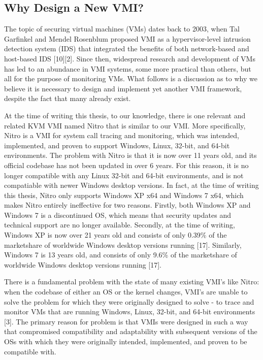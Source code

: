 \documentclass{report}
\begin{document}
\begin{spacing}{1.5}
\subsection{Why Design a New VMI?}

{\large
The topic of securing virtual machines (VMs) dates back to 2003, when Tal Garfinkel and Mendel Rosenblum proposed VMI as a hypervisor-level intrusion detection system (IDS) that integrated the benefits of both network-based and host-based IDS [10][2]. Since then, widespread research and development of VMs has led to an abundance in VMI systems, some more practical than others, but all for the purpose of monitoring VMs. What follows is a discussion as to why we believe it is necessary to design and implement yet another VMI framework, despite the fact that many already exist.
\newline
}


{\large
At the time of writing this thesis, to our knowledge, there is one relevant and related KVM VMI named Nitro that is similar to our VMI. More specifically, Nitro is a VMI for system call tracing and monitoring, which was intended, implemented, and proven to support Windows, Linux, 32-bit, and 64-bit environments. The problem with Nitro is that it is now over 11 years old, and its official codebase has not been updated in over 6 years. For this reason, it is no longer compatible with any Linux 32-bit and 64-bit environments, and is not compatiable with newer Windows desktop versions. In fact, at the time of writing this thesis, Nitro only supports Windows XP x64 and Windows 7 x64, which makes Nitro entirely ineffective for two reasons. Firstly, both Windows XP and Windows 7 is a discontinued OS, which means that security updates and technical support are no longer available. Secondly, at the time of writing, Windows XP is now over 21 years old and consists of only 0.39\% of the marketshare of worldwide Windows desktop versions running [17]. Similarly, Windows 7 is 13 years old, and consists of only 9.6\% of the marketshare of worldwide Windows desktop versions running [17].
\newline
}

{\large
There is a fundamental problem with the state of many existing VMI's like Nitro: when the codebase of either an OS or the kernel changes, VMI's are unable to solve the problem for which they were originally designed to solve - to trace and monitor VMs that are running Windows, Linux, 32-bit, and 64-bit environments [3]. The primary reason for problem is that VMIs were designed in such a way that compromised compatibility and adaptability with subsequent versions of the OSs with which they were originally intended, implemented, and proven to be compatible with. 
\newline
}


\end{spacing}
\end{document}
